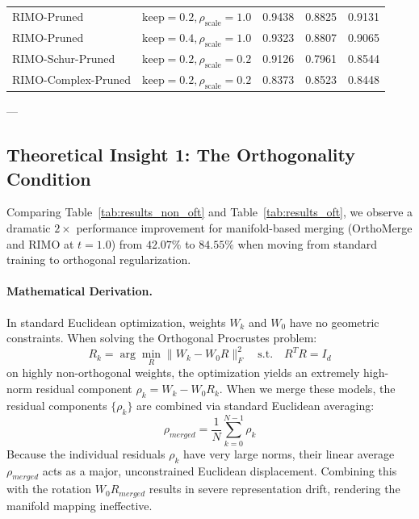 \begin{table}[ht]
\begin{footnotesize}
\begin{sc}
{\begin{tabular}{llccc}
RIMO-Pruned & $\text{keep} = 0.2, \rho_{\text{scale}} = 1.0$ & 0.9438 & 0.8825 & 0.9131 \\
RIMO-Pruned & $\text{keep} = 0.4, \rho_{\text{scale}} = 1.0$ & 0.9323 & 0.8807 & 0.9065 \\
RIMO-Schur-Pruned & $\text{keep} = 0.2, \rho_{\text{scale}} = 0.2$ & 0.9126 & 0.7961 & 0.8544 \\
RIMO-Complex-Pruned & $\text{keep} = 0.2, \rho_{\text{scale}} = 0.2$ & 0.8373 & 0.8523 & 0.8448 \\
\bottomrule
\end{tabular}%
}
\end{sc}
\end{footnotesize}
\vskip -0.15in
\end{table}

---

\subsection{Theoretical Insight 1: The Orthogonality Condition}
Comparing Table~\ref{tab:results_non_oft} and Table~\ref{tab:results_oft}, we observe a dramatic $2\times$ performance improvement for manifold-based merging (OrthoMerge and RIMO at $t=1.0$) from $42.07\%$ to $84.55\%$ when moving from standard training to orthogonal regularization.

\paragraph{Mathematical Derivation.}
In standard Euclidean optimization, weights $W_k$ and $W_0$ have no geometric constraints. When solving the Orthogonal Procrustes problem:
\begin{equation}
R_k = \arg\min_{R} \|W_k - W_0 R\|_F^2 \quad \text{s.t.} \quad R^T R = I_d
\end{equation}
on highly non-orthogonal weights, the optimization yields an extremely high-norm residual component $\rho_k = W_k - W_0 R_k$. When we merge these models, the residual components $\{\rho_k\}$ are combined via standard Euclidean averaging:
\begin{equation}
\rho_{merged} = \frac{1}{N} \sum_{k=0}^{N-1} \rho_k
\end{equation}
Because the individual residuals $\rho_k$ have very large norms, their linear average $\rho_{merged}$ acts as a major, unconstrained Euclidean displacement. Combining this with the rotation $W_0 R_{merged}$ results in severe representation drift, rendering the manifold mapping ineffective.

